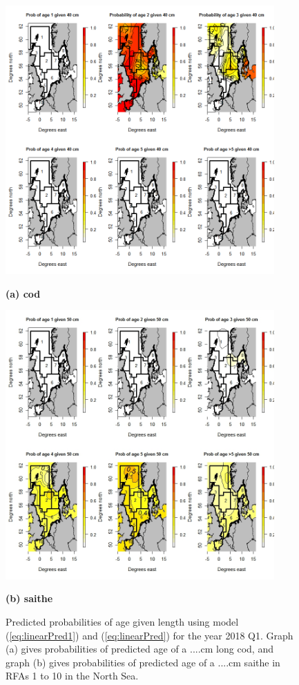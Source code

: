 \documentclass[a4paper 12pt]{article}
\numberwithin{equation}{section}
\begin{document}
\clearpage
\begin{figure}[h!]
\centering
\begin{minipage}[c]{0.70\linewidth}
\includegraphics[width=103mm,scale=9.5]{Allcode40cm2015.png}
\caption*{\bf (a) cod}
\label{fig1.1}
\end{minipage}

\quad
\begin{minipage}[c]{0.70\linewidth}
\includegraphics[width=103mm,scale=9.5]{saithe2015Q1Map.jpeg}
\caption*{\bf (b) saithe}
\label{fig5.1}
\end{minipage}
 \caption{Predicted probabilities of age given length using model (\ref{eq:linearPred1}) and (\ref{eq:linearPred}) for the year 2018 Q1. Graph (a) gives probabilities of predicted age of a ....cm long cod, and graph (b) gives probabilities of predicted age of a ....cm saithe in RFAs 1 to 10 in the North Sea.}
  \label{predictedprobabilitiesplot}
\end{figure}
\end{document}
